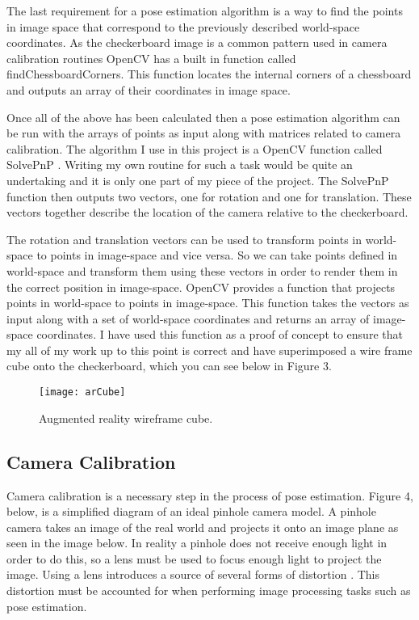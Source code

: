\documentclass{article}
\begin{document}
The last requirement for a pose estimation algorithm is a way to find the points in image space that correspond to the previously described world-space coordinates. As the checkerboard image is a common pattern used in camera calibration routines OpenCV has a built in function called findChessboardCorners. This function locates the internal corners of a chessboard and outputs an array of their coordinates in image space. \par

Once all of the above has been calculated then a pose estimation algorithm can be run with the arrays of points as input along with matrices related to camera calibration. The algorithm I use in this project is a OpenCV function called SolvePnP \cite{calib3}. Writing my own routine for such a task would be quite an undertaking and it is only one part of my piece of the project. The SolvePnP function then outputs two vectors, one for rotation and one for translation. These vectors together describe the location of the camera relative to the checkerboard. \par

The rotation and translation vectors can be used to transform points in world-space to points in image-space and vice versa. So we can take points defined in world-space and transform them using these vectors in order to render them in the correct position in image-space. OpenCV provides a function that projects points in world-space to points in image-space. This function takes the vectors as input along with a set of world-space coordinates and returns an array of image-space coordinates. I have used this function as a proof of concept to ensure that my all of my work up to this point is correct and have superimposed a wire frame cube onto the checkerboard, which you can see below in Figure 3.


\begin{figure}[H]
\begin{center}
\texttt{[image: arCube]} 
\caption{Augmented reality wireframe cube.}
\end{center}
\end{figure}

\subsection{Camera Calibration}

Camera calibration is a necessary step in the process of pose estimation. Figure 4, below, is a simplified diagram of an ideal pinhole camera model. A pinhole camera takes an image of the real world and projects it onto an image plane \cite{pinhole} as seen in the image below. In reality a pinhole does not receive enough light in order to do this, so a lens must be used to focus enough light to project the image. Using a lens introduces a source of several forms of distortion \cite{calib1}. This distortion must be accounted for when performing image processing tasks such as pose estimation. \par
\end{document}
